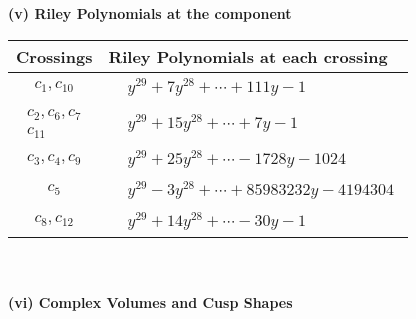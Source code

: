 \documentclass[1p]{elsarticle_modified}
\theoremstyle{definition}
\begin{document}
\flushleft \textbf{(v) Riley Polynomials at the component}\newline \\
\begin{tabular}{m{50pt}|m{274pt}}
Crossings & \hspace{64pt}Riley Polynomials at each crossing \\
\hline $$\begin{aligned}c_{1},c_{10}\end{aligned}$$&$\begin{aligned}
&y^{29}+7 y^{28}+\cdots+111 y-1
\end{aligned}$\\
\hline $$\begin{aligned}c_{2},c_{6},c_{7}\\c_{11}\end{aligned}$$&$\begin{aligned}
&y^{29}+15 y^{28}+\cdots+7 y-1
\end{aligned}$\\
\hline $$\begin{aligned}c_{3},c_{4},c_{9}\end{aligned}$$&$\begin{aligned}
&y^{29}+25 y^{28}+\cdots-1728 y-1024
\end{aligned}$\\
\hline $$\begin{aligned}c_{5}\end{aligned}$$&$\begin{aligned}
&y^{29}-3 y^{28}+\cdots+85983232 y-4194304
\end{aligned}$\\
\hline $$\begin{aligned}c_{8},c_{12}\end{aligned}$$&$\begin{aligned}
&y^{29}+14 y^{28}+\cdots-30 y-1
\end{aligned}$\\
\hline
\end{tabular}\\~\\
\newpage\flushleft \textbf{(vi) Complex Volumes and Cusp Shapes}
\end{document}
